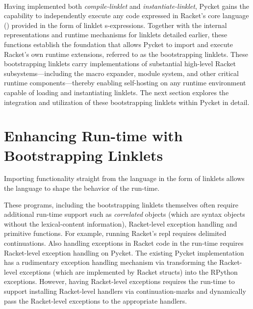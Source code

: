 		\paragraph{}%
			Having implemented both \emph{compile-linklet} and \emph{instantiate-linklet}, Pycket gains the capability to independently execute any code expressed in Racket's core language () provided in the form of linklet s-expressions. Together with the internal representations and runtime mechanisms for linklets detailed earlier, these functions establish the foundation that allows Pycket to import and execute Racket’s own runtime extensions, referred to as the bootstrapping linklets. These bootstrapping linklets carry implementations of substantial high-level Racket subsystems—including the macro expander, module system, and other critical runtime components—thereby enabling self-hosting on any runtime environment capable of loading and instantiating linklets. The next section explores the integration and utilization of these bootstrapping linklets within Pycket in detail.

	\section[\texorpdfstring{Enhancing Run-time with Bootstrapping Linklets}{Bootstrapping Linklets}]{Enhancing Run-time with Bootstrapping Linklets}
		\begin{mainpoint}
			Importing functionality straight from the language in the form of linklets allows the language to shape the behavior of the run-time.
		\end{mainpoint}






These programs, including the bootstrapping linklets themselves often
require additional run-time support such as \emph{correlated} objects
(which are syntax objects without the lexical-content information),
Racket-level exception handling and primitive functions. For example,
running Racket's repl requires delimited continuations. Also handling
exceptions in Racket code in the run-time requires Racket-level
exception handling on Pycket. The existing Pycket implementation has a
rudimentary exception handling mechanism via transforming the
Racket-level exceptions (which are implemented by Racket structs) into
the RPython exceptions. However, having Racket-level exceptions
requires the run-time to support installing Racket-level handlers via
continuation-marks and dynamically pass the Racket-level exceptions to
the appropriate handlers.

